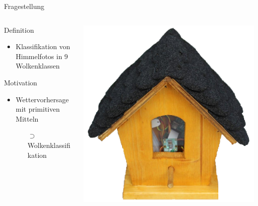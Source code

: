 \begin{frame}{Fragestellung}
  \begin{columns}
    \begin{column}{0.5\textwidth}
      \begin{block}{Definition}
        \begin{itemize}
          \item Klassifikation von Himmelfotos in 9 Wolkenklassen
        \end{itemize}
      \end{block}
      \begin{block}{Motivation}
        \begin{itemize}
          \item Wettervorhersage mit primitiven Mitteln
            \begin{itemize}
              \item[$\supset$] \alert{Wolkenklassifikation}
            \end{itemize}
        \end{itemize}
      \end{block}
    \end{column}
    \begin{column}{0.5\textwidth}
      \centering
      \includegraphics[height=0.7\textheight]{content/wetterstation.png}
    \end{column}
  \end{columns}
\end{frame}


